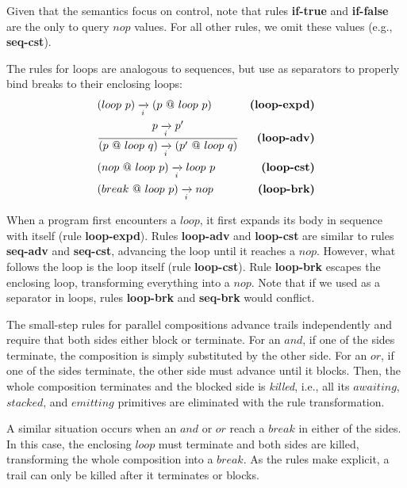Given that the semantics focus on control, note that rules \textbf{if-true} and 
\textbf{if-false} are the only to query $nop$ values.
For all other rules, we omit these values (e.g., \textbf{seq-cst}).

The rules for loops are analogous to sequences, but use  as 
separators to properly bind breaks to their enclosing loops:
%
\begin{eqnarray*}
& { (loop~p) \xrightarrow[i]{} (p~@~loop~p) }
    & \textbf{(loop-expd)}       \\
& \frac
    { p \xrightarrow[i]{} p' }
    { (p~@~loop~q) \xrightarrow[i]{} (p'~@~loop~q) }
    & \textbf{(loop-adv)}    \\
& (nop~@~loop~p) \xrightarrow[i]{} loop~p
    & \textbf{(loop-cst)}    \\
& (break~@~loop~p) \xrightarrow[i]{} nop
    & \textbf{(loop-brk)}
\end{eqnarray*}

When a program first encounters a $loop$, it first expands its body in sequence 
with itself (rule \textbf{loop-expd}).
Rules \textbf{loop-adv} and \textbf{loop-cst} are similar to rules 
\textbf{seq-adv} and \textbf{seq-cst}, advancing the loop until it reaches a 
$nop$.
However, what follows the loop is the loop itself (rule \textbf{loop-cst}).
Rule \textbf{loop-brk} escapes the enclosing loop, transforming everything into 
a $nop$.
Note that if we used  as a separator in loops, rules 
\textbf{loop-brk} and \textbf{seq-brk} would conflict.

The small-step rules for parallel compositions advance trails independently and 
require that both sides either block or terminate.
For an $and$, if one of the sides terminate, the composition is simply
substituted by the other side.
For an $or$, if one of the sides terminate, the other side must advance until 
it blocks.
Then, the whole composition terminates and the blocked side is \emph{killed}, 
i.e., all its $awaiting$, $stacked$, and $emitting$ primitives are eliminated 
with the rule transformation.

A similar situation occurs when an $and$ or $or$ reach a $break$ in either of 
the sides.
In this case, the enclosing $loop$ must terminate and both sides are killed, 
transforming the whole composition into a $break$.
As the rules make explicit, a trail can only be killed after it terminates or 
blocks.

